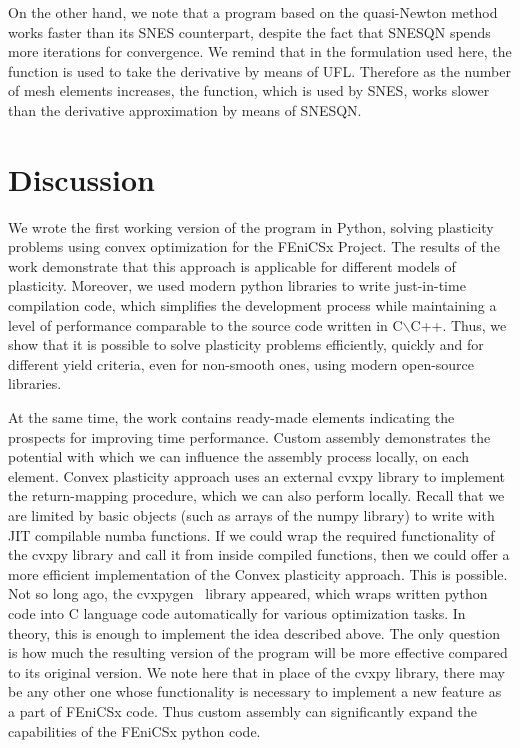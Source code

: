 \documentclass[12pt]{article}
\begin{document}
On the other hand, we note that a program based on the quasi-Newton method works faster than its SNES counterpart, despite the fact that SNESQN spends more iterations for convergence. We remind that in the formulation used here, the  function is used to take the derivative by means of UFL. Therefore as the number of mesh elements increases, the  function, which is used by SNES, works slower than the derivative approximation by means of SNESQN.

\newpage
\section{Discussion}
\label{sec:discussion}

We wrote the first working version of the program in Python, solving plasticity problems using convex optimization for the FEniCSx Project. The results of the work demonstrate that this approach is applicable for different models of plasticity. Moreover, we used modern python libraries to write just-in-time compilation code, which simplifies the development process while maintaining a level of performance comparable to the source code written in C$\backslash$C++. Thus, we show that it is possible to solve plasticity problems efficiently, quickly and for different yield criteria, even for non-smooth ones, using modern open-source libraries. 

At the same time, the work contains ready-made elements indicating the prospects for improving time performance. Custom assembly demonstrates the potential with which we can influence the assembly process locally, on each element. Convex plasticity approach uses an external cvxpy library to implement the return-mapping procedure, which we can also perform locally. Recall that we are limited by basic objects (such as arrays of the numpy library) to write with JIT compilable numba functions. If we could wrap the required functionality of the cvxpy library and call it from inside compiled functions, then we could offer a more efficient implementation of the Convex plasticity approach. This is possible. Not so long ago, the cvxpygen~\parencite{cvxpygen2022} library appeared, which wraps written python code into C language code automatically for various optimization tasks. In theory, this is enough to implement the idea described above. The only question is how much the resulting version of the program will be more effective compared to its original version. We note here that in place of the cvxpy library, there may be any other one whose functionality is necessary to implement a new feature as a part of FEniCSx code. Thus custom assembly can significantly expand the capabilities of the FEniCSx python code.
\end{document}
